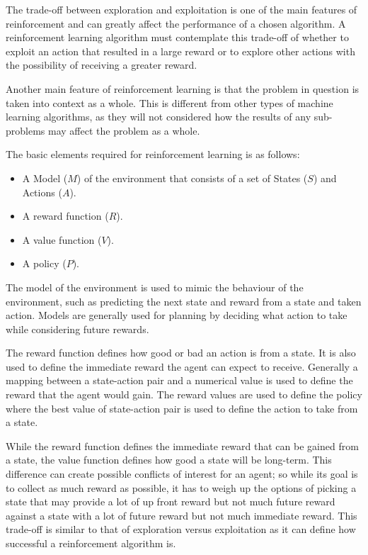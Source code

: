 The trade-off between exploration and exploitation is one of the main features of reinforcement and can greatly affect the performance of a chosen algorithm. A reinforcement learning algorithm must contemplate this trade-off of whether to exploit an action that resulted in a large reward or to explore other actions with the possibility of receiving a greater reward.

Another main feature of reinforcement learning is that the problem in question is taken into context as a whole. This is different from other types of machine learning algorithms, as they will not considered how the results of any sub-problems may affect the problem as a whole.

The basic elements required for reinforcement learning is as follows:
\begin{itemize}
\item A Model ($M$) of the environment that consists of a set of States ($S$) and Actions ($A$).
\item A reward function ($R$).
\item A value function ($V$).
\item A policy ($P$).
\end{itemize}

The model of the environment is used to mimic the behaviour of the environment, such as predicting the next state and reward from a state and taken action. Models are generally used for planning by deciding what action to take while considering future rewards.

The reward function defines how good or bad an action is from a state. It is also used to define the immediate reward the agent can expect to receive. Generally a mapping between a state-action pair and a numerical value is used to define the reward that the agent would gain. The reward values are used to define the policy where the best value of state-action pair is used to define the action to take from a state. 

While the reward function defines the immediate reward that can be gained from a state, the value function defines how good a state will be long-term. This difference can create possible conflicts of interest for an agent; so while its goal is to collect as much reward as possible, it has to weigh up the options of picking a state that may provide a lot of up front reward but not much future reward against a state with a lot of future reward but not much immediate reward. This trade-off is similar to that of exploration versus exploitation as it can define how successful a reinforcement algorithm is.

